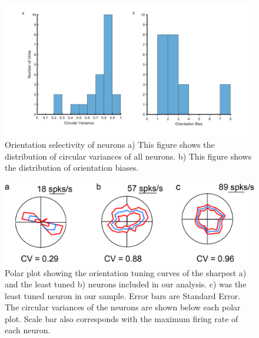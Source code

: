 	
	\begin{figure}[]
		
		\includegraphics[width=\linewidth]{superiorcolliculus/orituning_fig.jpg}
		\caption{Orientation selectivity of neurons a) This figure shows the distribution of circular variances of all neurons. b) This figure shows the distribution of orientation biases.}
		\label{fig:orihist}
	\end{figure}
	
	
	\begin{figure}[]
		\includegraphics[width=\linewidth]{superiorcolliculus/rangeoritun.jpg}
		\caption{Polar plot showing the orientation tuning curves of the sharpest a) and the least tuned b) neurons included in our analysis. c) was the least tuned neuron in our sample. Error bars are Standard Error. The circular variances of the neurons are shown below each polar plot. Scale bar also corresponds with the maximum firing rate of each neuron.}
		\label{fig:range}			
	\end{figure}
	

